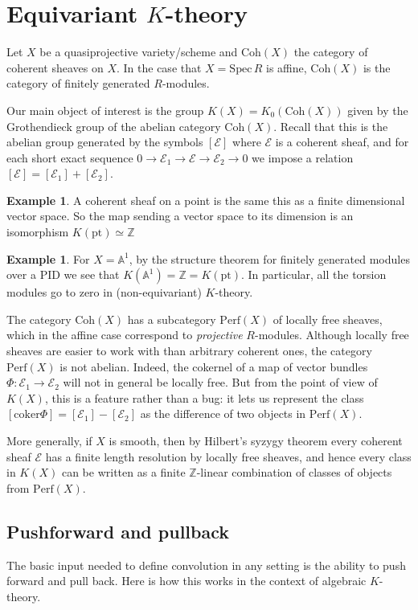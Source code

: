 \documentclass[11pt]{amsart}
\theoremstyle{definition}
\newtheorem{example}[dummy]{Example}
\newcommand{\bZ}{\mathbb{Z}}
\newcommand{\Perf}{\mathrm{Perf}}
\newcommand{\cok}{\mathrm{coker}}
\newcommand{\Spec}{\mathrm{Spec}\,}
\newcommand{\Coh}{\mathrm{Coh}}
\numberwithin{equation}{subsection}
\numberwithin{figure}{subsection}
\newcommand{\pt}{\mathrm{pt}}
\begin{document}
\section{Equivariant $K$-theory}
Let $X$ be a quasiprojective variety/scheme and $\Coh(X)$ the category of coherent sheaves on $X$. In the case that $X=\Spec R$ is affine, $\Coh(X)$ is the category of finitely generated $R$-modules. 

Our main object of interest is the group $K(X) = K_0(\Coh(X))$ given by the Grothendieck group of the abelian category $\Coh(X)$. Recall that this is the abelian group generated by the symbols $[\mathcal{E}]$ where $\mathcal{E}$ is a coherent sheaf, and for each short exact sequence $0\rightarrow \mathcal{E}_1\rightarrow \mathcal{E}\rightarrow \mathcal{E}_2\rightarrow 0$ we impose a relation $[\mathcal{E}]=[\mathcal{E}_1]+[\mathcal{E}_2]$.
\begin{example}
A coherent sheaf on a point is the same this as a finite dimensional vector space. So the map sending a vector space to its dimension is an isomorphism $K(\pt)\simeq\bZ$
\end{example}

\begin{example}
For $X=\mathbb{A}^1$, by the structure theorem for finitely generated modules over a PID we see that $K(\mathbb{A}^1)=\mathbb{Z}=K(\pt)$. In particular, all the torsion modules go to zero in (non-equivariant) $K$-theory.
\end{example}

The category $\Coh(X)$ has a subcategory $\Perf(X)$ of locally free sheaves, which in the affine case correspond to \emph{projective} $R$-modules. 
 Although locally free sheaves are easier to work with than arbitrary coherent ones, the category $\Perf(X)$ is not abelian. Indeed, the cokernel of a map of vector bundles $\Phi:\mathcal{E}_1\rightarrow\mathcal{E}_2$ will not in general be locally free.   But from the point of view of  $K(X)$, this is a feature rather than a bug: it lets us represent  
the class $[\cok\Phi]=[\mathcal{E}_1]-[\mathcal{E}_2]$ as the difference of two objects in $\Perf(X)$.

More generally, if $X$ is smooth, then by Hilbert's syzygy theorem every coherent sheaf $\mathcal{E}$ has a finite length resolution by locally free sheaves, and hence every class in $K(X)$ can be written as a finite $\mathbb{Z}$-linear combination of classes of objects from $\Perf(X)$.


\subsection{Pushforward and pullback}
The basic input needed to define convolution in any setting is the ability to push forward and pull back. Here is how this works in the context of algebraic $K$-theory.
\end{document}
